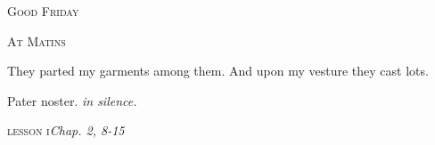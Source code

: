 ﻿%
\vspace*{-50pt plus 20pt}
\begin{center}{%
\huge \textsc{Good Friday}

\bigskip
\normalsize\textsc{At Matins}
}\end{center}


\def\officehour{Matins}
\def\matinsnocturn{1st Nocturn}
%
\large
{
\def\preant{\setgrefactor{17}\large}
\def\prepsalm{\normalsize}
\def\anttranslation{The kings of the earth stood up, and the princes met together, against the Lord, and against His Anointed.}
\def\psalmtranslationsmall{T}
\def\prerepeatantiphon{\vspace{-20pt}}
}
%
{
\def\preant{\setgrefactor{17}\large}
\def\prepsalm{\normalsize\setgrefactor{15}}
\def\psalmtranslationsmall{T}
\def\anttranslation{They parted my garments amongst them, and upon my vesture they cast lots.}
\let\prepsalm=\undefined
}
\bigskip
%
{
\def\preant{\setgrefactor{17}\large}
\def\psalmtranslationsmall{T}
\def\anttranslation{False witnesses are risen up against me, and iniquity hath belied itself.}
\def\prepsalm{\setgrefactor{16}\normalsize}
\let\prepsalm=\undefined
}

\bigskip
{
{They parted my garments among them.}
{And upon my vesture they cast lots.}
}

\bigskip
Pater noster. \emph{in silence.}

\bigskip\bigskip
\hspace{10ex}\textsc{lesson i}\hfill\emph{Chap. 2, 8-15}\hspace{10ex}

